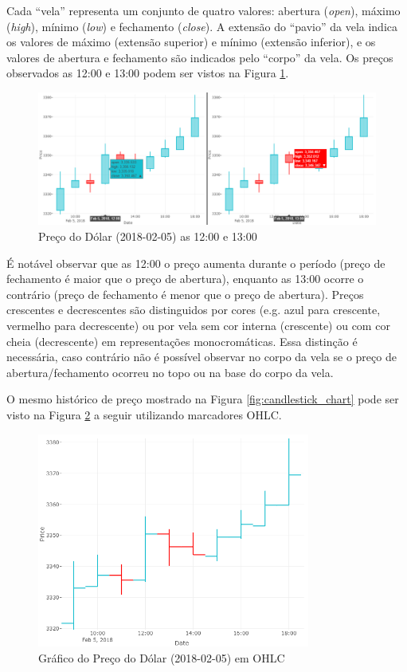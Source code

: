 \documentclass[12pt]{article}
\begin{document}
Cada ``vela'' representa um conjunto de quatro valores: abertura (\textit{open}),
máximo (\textit{high}), mínimo (\textit{low}) e fechamento (\textit{close}).
A extensão do ``pavio'' da vela indica os valores de máximo (extensão superior) e mínimo
(extensão inferior), e os valores de abertura e fechamento são indicados pelo ``corpo''
da vela.
Os preços observados as 12:00 e 13:00 podem ser vistos na Figura \ref{fig:chart_dynamic}.

\begin{figure}[H]
	\centering
	\includegraphics[width=\textwidth]{chart_dynamic.png}
	\caption{Preço do Dólar (2018-02-05) as 12:00 e 13:00}
	\label{fig:chart_dynamic}
\end{figure}

É notável observar que as 12:00 o preço aumenta durante o período (preço de fechamento é
maior que o preço de abertura), enquanto as 13:00 ocorre o contrário (preço de fechamento é
menor  que o preço de abertura). Preços crescentes e decrescentes são distinguidos por cores
(e.g. azul para crescente, vermelho para decrescente) ou por vela sem cor interna (crescente)
ou com cor cheia (decrescente) em representações monocromáticas. Essa distinção é necessária,
caso contrário não é possível observar no corpo da vela se o preço de abertura/fechamento
ocorreu no topo ou na base do corpo da vela.

O mesmo histórico de preço mostrado na Figura \ref{fig:candlestick_chart}
pode ser visto na Figura \ref{fig:ohlc_chart} a seguir utilizando marcadores OHLC.

\begin{figure}[H]
	\centering
	\includegraphics[width=0.8\textwidth]{ohlc_chart.png}
	\caption{Gráfico do Preço do Dólar (2018-02-05) em OHLC}
	\label{fig:ohlc_chart}
\end{figure}
\end{document}
